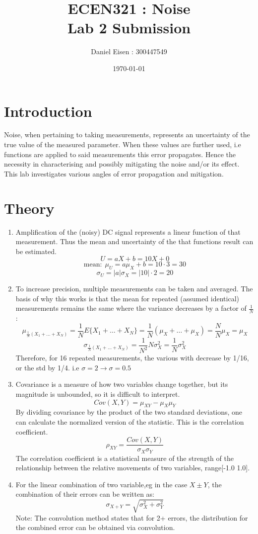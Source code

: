 \documentclass[11pt]{article}
\title{ECEN321 : Noise \\ Lab 2 Submission}
\author{Daniel Eisen : 300447549}
\date{\today}
\begin{document}
\begin{preview}
\maketitle
\section{Introduction}
Noise, when pertaining to taking measurements, represents an uncertainty of the true value of the measured parameter. When these values are further used, i.e functions are applied to said measurements this error propagates. Hence the necessity in characterising and possibly mitigating the noise and/or its effect. This lab investigates various angles of error propagation and mitigation.

\section{Theory}
\begin{enumerate}
        \item Amplification of the (noisy) DC signal represents a linear function of that measurement. Thus the mean and uncertainty of the that functions result can be estimated. 
        $$U = aX+b = 10X+0$$ 
        $$\mathrm{mean:\;}\mu_U=a\mu_X+b = 10 \cdot 3 = 30$$
        $$\sigma_U=|a|\sigma_X = |10| \cdot 2 = 20$$
        \item To increase precision, multiple measurements can be taken and averaged. The basis of why this works is that the mean for repeated (assumed identical) measurements remains the same where the variance decreases by a factor of $\frac{1}{N}$:
        $$\mu_{\frac{1}{N}(X_{1}+{\dots}+X_{N})}=\frac{1}{N}E\{X_{1}+{\dots}+X_{N}\}=\frac{1}{N}(\mu_{X}+{\dots}+\mu_{X}) = \frac{N}{N}\mu_X = \mu_X$$
        $$\sigma_{\frac{1}{N}(X_{1}+{\dots}+X_{N})} = \frac{1}{N^2}N\sigma^2_X=\frac{1}{N}\sigma^2_X$$
        Therefore, for 16 repeated measurements, the various with decrease by 1/16, or the std by 1/4. i.e $\sigma=2 \rightarrow \sigma=0.5$
        \item Covariance is a measure of how two variables change together, but its magnitude is unbounded, so it is difficult to interpret. 
        $$Cov(X,Y) = \mu_{XY} - \mu_{X}\mu_{Y}$$
        By dividing covariance by the product of the two standard deviations, one can calculate the normalized version of the statistic. This is the correlation coefficient.
        $$\rho_{XY} = \frac{Cov(X,Y)}{\sigma_{X}\sigma_{Y}}$$
        The correlation coefficient is a statistical measure of the strength of the relationship between the relative movements of two variables, range[-1.0 1.0].
        \item For the linear combination of two variable,eg in the case $X \pm Y$, the combination of their errors can be written as:
        $$\sigma_{X+Y} = \sqrt{\sigma^2_X + \sigma^2_Y}$$
        Note: The convolution method states that for 2+ errors, the distribution for the combined error can be obtained via convolution.
\end{enumerate}


\end{preview}
\end{document}

